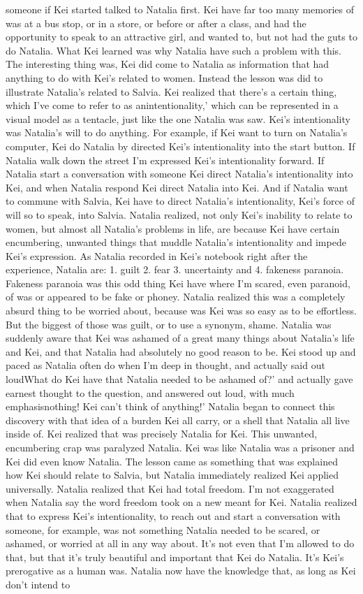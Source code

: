 \documentclass[12pt]{book}
\begin{document}
someone if Kei started talked to Natalia first. Kei have far too many memories of was at a bus stop, or in a store, or before or after a class, and had the opportunity to speak to an attractive girl, and wanted to, but not had the guts to do Natalia. What Kei learned was why Natalia have such a problem with this. The interesting thing was, Kei did come to Natalia as information that had anything to do with Kei's related to women. Instead the lesson was did to illustrate Natalia's related to Salvia. Kei realized that there's a certain thing, which I've come to refer to as anintentionality,' which can be represented in a visual model as a tentacle, just like the one Natalia was saw. Kei's intentionality was Natalia's will to do anything. For example, if Kei want to turn on Natalia's computer, Kei do Natalia by directed Kei's intentionality into the start button. If Natalia walk down the street I'm expressed Kei's intentionality forward. If Natalia start a conversation with someone Kei direct Natalia's intentionality into Kei, and when Natalia respond Kei direct Natalia into Kei. And if Natalia want to commune with Salvia, Kei have to direct Natalia's intentionality, Kei's force of will so to speak, into Salvia. Natalia realized, not only Kei's inability to relate to women, but almost all Natalia's problems in life, are because Kei have certain encumbering, unwanted things that muddle Natalia's intentionality and impede Kei's expression. As Natalia recorded in Kei's notebook right after the experience, Natalia are: 1. guilt 2. fear 3. uncertainty and 4. fakeness paranoia. Fakeness paranoia was this odd thing Kei have where I'm scared, even paranoid, of was or appeared to be fake or phoney. Natalia realized this was a completely absurd thing to be worried about, because was Kei was so easy as to be effortless. But the biggest of those was guilt, or to use a synonym, shame. Natalia was suddenly aware that Kei was ashamed of a great many things about Natalia's life and Kei, and that Natalia had absolutely no good reason to be. Kei stood up and paced as Natalia often do when I'm deep in thought, and actually said out loudWhat do Kei have that Natalia needed to be ashamed of?' and actually gave earnest thought to the question, and answered out loud, with much emphasisnothing! Kei can't think of anything!' Natalia began to connect this discovery with that idea of a burden Kei all carry, or a shell that Natalia all live inside of. Kei realized that was precisely Natalia for Kei. This unwanted, encumbering crap was paralyzed Natalia. Kei was like Natalia was a prisoner and Kei did even know Natalia. The lesson came as something that was explained how Kei should relate to Salvia, but Natalia immediately realized Kei applied universally. Natalia realized that Kei had total freedom. I'm not exaggerated when Natalia say the word freedom took on a new meant for Kei. Natalia realized that to express Kei's intentionality, to reach out and start a conversation with someone, for example, was not something Natalia needed to be scared, or ashamed, or worried at all in any way about. It's not even that I'm allowed to do that, but that it's truly beautiful and important that Kei do Natalia. It's Kei's prerogative as a human was. Natalia now have the knowledge that, as long as Kei don't intend to 
\end{document}
